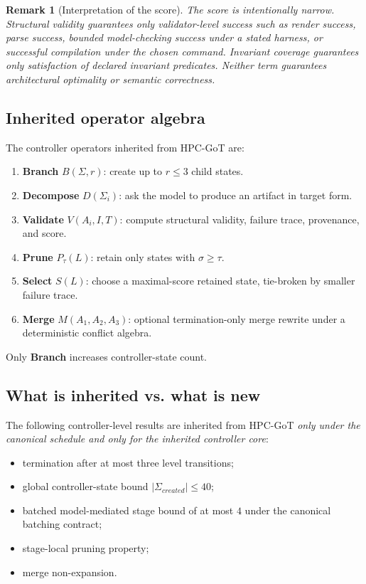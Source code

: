 \documentclass[11pt,a4paper,oneside]{article}
\newtheorem{remark}{Remark}[section]
\begin{document}
\begin{remark}[Interpretation of the score]
The score is intentionally narrow. Structural validity guarantees only validator-level success such as render success, parse success, bounded model-checking success under a stated harness, or successful compilation under the chosen command. Invariant coverage guarantees only satisfaction of declared invariant predicates. Neither term guarantees architectural optimality or semantic correctness.
\end{remark}

\subsection{Inherited operator algebra}
The controller operators inherited from HPC-GoT are:
\begin{enumerate}[leftmargin=2em]
    \item \textbf{Branch} $B(\Sigma,r)$: create up to $r\le 3$ child states.
    \item \textbf{Decompose} $D(\Sigma_i)$: ask the model to produce an artifact in target form.
    \item \textbf{Validate} $V(A_i,I,T)$: compute structural validity, failure trace, provenance, and score.
    \item \textbf{Prune} $P_\tau(L)$: retain only states with $\sigma \ge \tau$.
    \item \textbf{Select} $S(L)$: choose a maximal-score retained state, tie-broken by smaller failure trace.
    \item \textbf{Merge} $M(A_1,A_2,A_3)$: optional termination-only merge rewrite under a deterministic conflict algebra.
\end{enumerate}
Only \textbf{Branch} increases controller-state count.

\subsection{What is inherited vs. what is new}
The following controller-level results are inherited from HPC-GoT \emph{only under the canonical schedule and only for the inherited controller core}:
\begin{itemize}[leftmargin=2em]
    \item termination after at most three level transitions;
    \item global controller-state bound $|\Sigma_{created}|\le 40$;
    \item batched model-mediated stage bound of at most $4$ under the canonical batching contract;
    \item stage-local pruning property;
    \item merge non-expansion.
\end{itemize}
\end{document}
